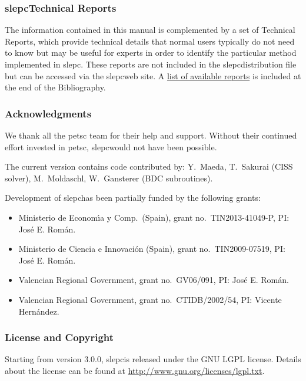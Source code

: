 \documentclass[titlepage,10pt,a4paper]{book}
\newcommand{\packnoi}[1]{{\sc #1}\xspace}
\newcommand{\slepc}{\texorpdfstring{\packnoi{slep\rm c}}{{SLEPc}}}
\begin{document}
{\subsubsection*{\slepc Technical Reports}

	The information contained in this manual is complemented by a set of Technical Reports, which provide technical details that normal users typically do not need to know but may be useful for experts in order to identify the particular method implemented in \slepc. These reports are not included in the \slepc distribution file but can be accessed via the \slepc web site. A \hyperlink{str}{list of available reports} is included at the end of the Bibliography.


\subsubsection*{Acknowledgments}

	We thank all the \packnoi{pets\rm c} team for their help and support. Without their continued effort invested in \packnoi{pets\rm c}, \slepc would not have been possible.

	The current version contains code contributed by: Y.\ Maeda, T.\ Sakurai (CISS solver), M.\ Moldaschl, W.\ Gansterer (BDC subroutines).

	Development of \slepc has been partially funded by the following grants:
\begin{itemize}
\setlength{\itemsep}{-2pt}
\item Ministerio de Econom\'{\i}a y Comp.\ (Spain), grant no.\ TIN2013-41049-P, PI: Jos\'e E. Rom\'an.
\item Ministerio de Ciencia e Innovaci\'on (Spain), grant no.\ TIN2009-07519, PI: Jos\'e E. Rom\'an.
\item Valencian Regional Government, grant no.\ GV06/091, PI: Jos\'e E. Rom\'an.
\item Valencian Regional Government, grant no.\ CTIDB/2002/54, PI: Vicente Hern\'andez.
\end{itemize}

\subsubsection*{License and Copyright}

Starting from version 3.0.0, \slepc is released under the GNU LGPL license. Details about the license can be found at \url{http://www.gnu.org/licenses/lgpl.txt}.

}
\end{document}
